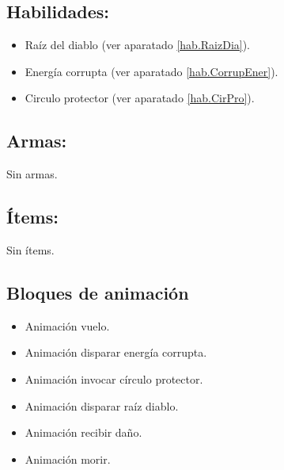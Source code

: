 \subsection{Habilidades:}
\begin{itemize} 
	\item Raíz del diablo (ver aparatado \ref{hab.RaizDia}).
	\item Energía corrupta (ver aparatado \ref{hab.CorrupEner}).
	\item Circulo protector (ver aparatado \ref{hab.CirPro}).
\end{itemize} 
\subsection{Armas:}
Sin armas.
\subsection{Ítems:}
Sin ítems.
\subsection{Bloques de animación}
	\begin{itemize}
		\item Animación vuelo.
		\item Animación disparar energía corrupta.
		\item Animación invocar círculo protector.
		\item Animación disparar raíz diablo.
		\item Animación recibir daño.
		\item Animación morir.
	\end{itemize}